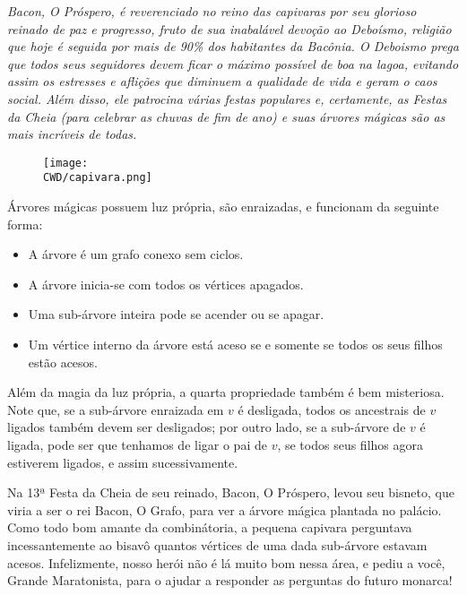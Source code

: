 %

\begin{center}
\textit{Bacon, O Próspero, é reverenciado no reino das capivaras por seu glorioso reinado de paz e progresso, fruto de sua inabalável devoção ao Deboísmo,
religião que hoje é seguida por mais de 90\% dos habitantes da Bacônia. O Deboismo prega que todos seus seguidores devem ficar o máximo possível
de boa na lagoa, evitando assim os estresses e aflições que diminuem a qualidade de vida e geram o caos social. Além disso, ele patrocina várias festas
populares e, certamente, as Festas da Cheia (para celebrar as chuvas de fim de ano) e suas árvores mágicas são as mais incríveis de todas.}
\end{center}

\begin{figure}[H]
  \centering
  \texttt{[image: \\CWD/capivara.png]}
\end{figure}

Árvores mágicas possuem luz própria, são enraizadas, e funcionam da seguinte forma:

\begin{itemize}
	\item A árvore é um grafo conexo sem ciclos.
	\item A árvore inicia-se com todos os vértices apagados.
	\item Uma sub-árvore inteira pode se acender ou se apagar.
	\item Um vértice interno da árvore está aceso se e somente se todos os seus filhos estão acesos.
\end{itemize}

Além da magia da luz própria, a quarta propriedade também é bem misteriosa. Note que, se a sub-árvore enraizada em $v$ é desligada,
todos os ancestrais de $v$ ligados também devem ser desligados; por outro lado, se a sub-árvore de $v$ é ligada, pode ser que tenhamos de ligar o pai de $v$,
se todos seus filhos agora estiverem ligados, e assim sucessivamente.

Na 13ª Festa da Cheia de seu reinado, Bacon, O Próspero, levou seu bisneto, que viria a ser o rei Bacon, O Grafo, para ver a árvore mágica plantada
no palácio. Como todo bom amante da combinátoria, a pequena capivara perguntava incessantemente ao bisavô quantos vértices de uma dada sub-árvore estavam acesos.
Infelizmente, nosso herói não é lá muito bom nessa área, e pediu a você, Grande Maratonista, para o ajudar a responder as perguntas do futuro monarca!

